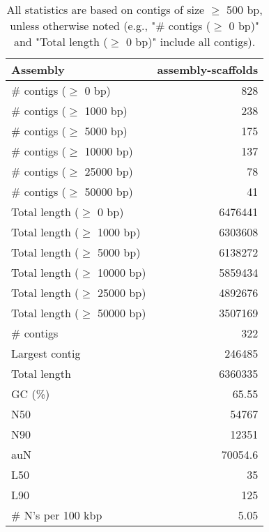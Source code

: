 \documentclass[12pt,a4paper]{article}
\begin{document}
\begin{table}[ht]
\begin{center}
\caption{All statistics are based on contigs of size $\geq$ 500 bp, unless otherwise noted (e.g., "\# contigs ($\geq$ 0 bp)" and "Total length ($\geq$ 0 bp)" include all contigs).}
\begin{tabular}{|l*{1}{|r}|}
\hline
Assembly & assembly-scaffolds \\ \hline
\# contigs ($\geq$ 0 bp) & 828 \\ \hline
\# contigs ($\geq$ 1000 bp) & 238 \\ \hline
\# contigs ($\geq$ 5000 bp) & 175 \\ \hline
\# contigs ($\geq$ 10000 bp) & 137 \\ \hline
\# contigs ($\geq$ 25000 bp) & 78 \\ \hline
\# contigs ($\geq$ 50000 bp) & 41 \\ \hline
Total length ($\geq$ 0 bp) & 6476441 \\ \hline
Total length ($\geq$ 1000 bp) & 6303608 \\ \hline
Total length ($\geq$ 5000 bp) & 6138272 \\ \hline
Total length ($\geq$ 10000 bp) & 5859434 \\ \hline
Total length ($\geq$ 25000 bp) & 4892676 \\ \hline
Total length ($\geq$ 50000 bp) & 3507169 \\ \hline
\# contigs & 322 \\ \hline
Largest contig & 246485 \\ \hline
Total length & 6360335 \\ \hline
GC (\%) & 65.55 \\ \hline
N50 & 54767 \\ \hline
N90 & 12351 \\ \hline
auN & 70054.6 \\ \hline
L50 & 35 \\ \hline
L90 & 125 \\ \hline
\# N's per 100 kbp & 5.05 \\ \hline
\end{tabular}
\end{center}
\end{table}
\end{document}
